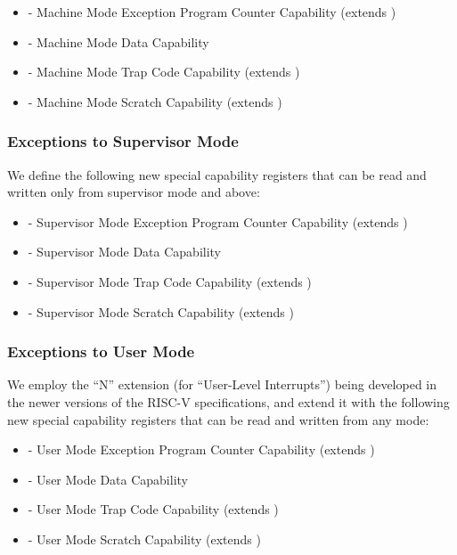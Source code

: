 \begin{itemize}
\item \MEPCC{} - Machine Mode Exception Program Counter Capability (extends
  \mepc{})
\item \MTDC{} - Machine Mode Data Capability
\item \MTCC{} - Machine Mode Trap Code Capability (extends \mtvec{})
\item \MScratchC{} - Machine Mode Scratch Capability (extends
  \mscratch{})
\end{itemize}

\subsubsection{Exceptions to Supervisor Mode}

We define the following new special capability registers that can be read and
written only from supervisor mode and above:

\begin{itemize}
\item \SEPCC{} - Supervisor Mode Exception Program Counter Capability (extends
  \sepc{})
\item \STDC{} - Supervisor Mode Data Capability
\item \STCC{} - Supervisor Mode Trap Code Capability (extends
  \stvec{})
\item \SScratchC{} - Supervisor Mode Scratch Capability (extends
  \sscratch{})
\end{itemize}

\subsubsection{Exceptions to User Mode}

We employ the ``N'' extension (for ``User-Level Interrupts'') being developed in
the newer versions of the RISC-V specifications, and extend it with the following
new special capability registers that can be read and written from any mode:

\begin{itemize}
\item \UEPCC{} - User Mode Exception Program Counter Capability (extends
  \uepc{})
\item \UTDC{} - User Mode Data Capability
\item \UTCC{} - User Mode Trap Code Capability (extends \utvec{})
\item \UScratchC{} - User Mode Scratch Capability (extends
  \uscratch{})
\end{itemize}

